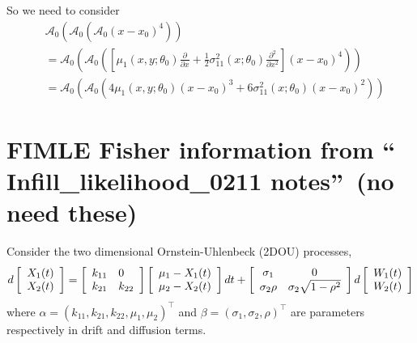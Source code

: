 \documentclass[11pt]{article}%
\theoremstyle{definition}
\begin{document}
So we need to consider%
\begin{align*}
&  \mathcal{A}_{0}(\mathcal{A}_{0}(\mathcal{A}_{0}(x-x_{0})^{4}))\\
&  =\mathcal{A}_{0}(\mathcal{A}_{0}(\left[  \mu_{1}\left(  x,y;\theta
_{0}\right)  \frac{\partial}{\partial x}+\frac{1}{2}\sigma_{11}^{2}\left(
x;\theta_{0}\right)  \frac{\partial^{2}}{\partial x^{2}}\right]  (x-x_{0}%
)^{4}))\\
&  =\mathcal{A}_{0}(\mathcal{A}_{0}(4\mu_{1}\left(  x,y;\theta_{0}\right)
(x-x_{0})^{3}+6\sigma_{11}^{2}\left(  x;\theta_{0}\right)  (x-x_{0})^{2}))
\end{align*}


\bigskip

\bigskip

\bigskip

\section{FIMLE Fisher information from \textquotedblleft
Infill\_likelihood\_0211 notes\textquotedblright\ (no need these)}

\bigskip

\bigskip Consider the two dimensional Ornstein-Uhlenbeck (2DOU) processes,
\[
d\left[
\begin{array}
[c]{l}%
{X_{1}(t)}\\
{X_{2}(t)}%
\end{array}
\right]  =\left[
\begin{array}
[c]{ll}%
{k_{11}} & {0}\\
{k_{21}} & {k_{22}}%
\end{array}
\right]  \left[
\begin{array}
[c]{l}%
{\mu_{1}-X_{1}(t)}\\
{\mu_{2}-X_{2}(t)}%
\end{array}
\right]  dt+\left[
\begin{array}
[c]{cc}%
{\sigma_{1}} & {0}\\
{\sigma_{2}\rho} & {\sigma_{2}\sqrt{1-\rho^{2}}}%
\end{array}
\right]  d\left[
\begin{array}
[c]{l}%
{W_{1}(t)}\\
{W_{2}(t)}%
\end{array}
\right]
\]
where $\alpha=\left(  k_{11},k_{21},k_{22},\mu_{1},\mu_{2}\right)  ^{\top}$
and $\beta=\left(  \sigma_{1},\sigma_{2},\rho\right)  ^{\top}$ are parameters
respectively in drift and diffusion terms.
\end{document}
